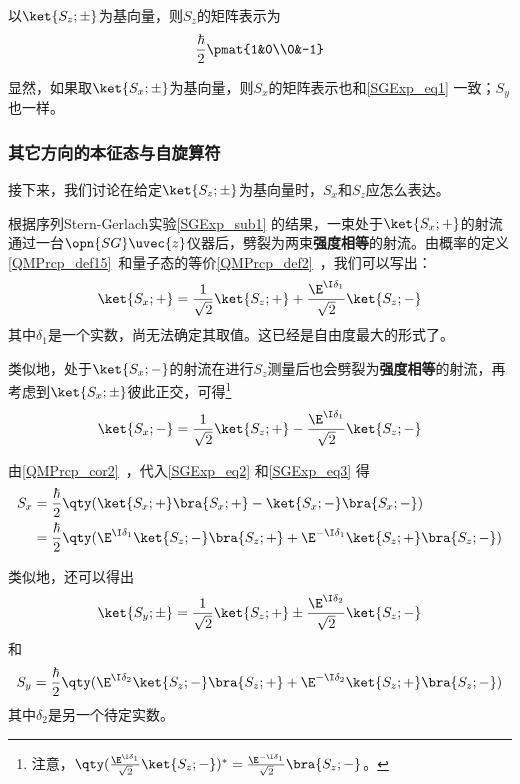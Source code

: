 以$\ket{S_z; \pm}$为基向量，则$S_z$的矩阵表示为
\begin{equation}\label{SGExp_eq1}
\frac{\hbar}{2}\pmat{1&0\\0&-1}
\end{equation}


显然，如果取$\ket{S_x; \pm}$为基向量，则$S_x$的矩阵表示也和\autoref{SGExp_eq1} 一致；$S_y$也一样。



\subsubsection{其它方向的本征态与自旋算符}


接下来，我们讨论在给定$\ket{S_z; \pm}$为基向量时，$S_x$和$S_z$应怎么表达。

根据序列Stern-Gerlach实验\autoref{SGExp_sub1} 的结果，一束处于$\ket{S_x; +}$的射流通过一台$\opn{SG}\uvec{z}$仪器后，劈裂为两束\textbf{强度相等}的射流。由概率的定义\autoref{QMPrcp_def15}~和量子态的等价\autoref{QMPrcp_def2}~，我们可以写出：
\begin{equation}\label{SGExp_eq2}
\ket{S_x; +}=\frac{1}{\sqrt{2}}\ket{S_z; +}+\frac{\E^{\I \delta_1}}{\sqrt{2}}\ket{S_z; -}
\end{equation}
其中$\delta_1$是一个实数，尚无法确定其取值。这已经是自由度最大的形式了。

类似地，处于$\ket{S_x; -}$的射流在进行$S_z$测量后也会劈裂为\textbf{强度相等}的射流，再考虑到$\ket{S_x; \pm}$彼此正交，可得\footnote{注意，$\qty(\frac{\E^{\I \delta_1}}{\sqrt{2}}\ket{S_z; -})^*=\frac{\E^{-\I \delta_1}}{\sqrt{2}}\bra{S_z; -}$。}
\begin{equation}\label{SGExp_eq3}
\ket{S_x; -}=\frac{1}{\sqrt{2}}\ket{S_z; +}-\frac{\E^{\I \delta_1}}{\sqrt{2}}\ket{S_z; -}
\end{equation}


由\autoref{QMPrcp_cor2}~，代入\autoref{SGExp_eq2} 和\autoref{SGExp_eq3} 得
\begin{equation}\label{SGExp_eq4}
\begin{aligned}
S_x &= \frac{\hbar}{2}\qty(\ket{S_x; +}\bra{S_x; +}-\ket{S_x; -}\bra{S_x; -})\\
&=\frac{\hbar}{2}\qty(\E^{\I\delta_1}\ket{S_z; -}\bra{S_z; +} + \E^{-\I\delta_1}\ket{S_z; +}\bra{S_z; -})
\end{aligned}
\end{equation}

类似地，还可以得出
\begin{equation}\label{SGExp_eq7}
\ket{S_y; \pm} = \frac{1}{\sqrt{2}}\ket{S_z; +}\pm\frac{\E^{\I\delta_2}}{\sqrt{2}}\ket{S_z; -}
\end{equation}
和
\begin{equation}\label{SGExp_eq5}
S_y=\frac{\hbar}{2}\qty(\E^{\I\delta_2}\ket{S_z; -}\bra{S_z; +} + \E^{-\I\delta_2}\ket{S_z; +}\bra{S_z; -})
\end{equation}
其中$\delta_2$是另一个待定实数。

